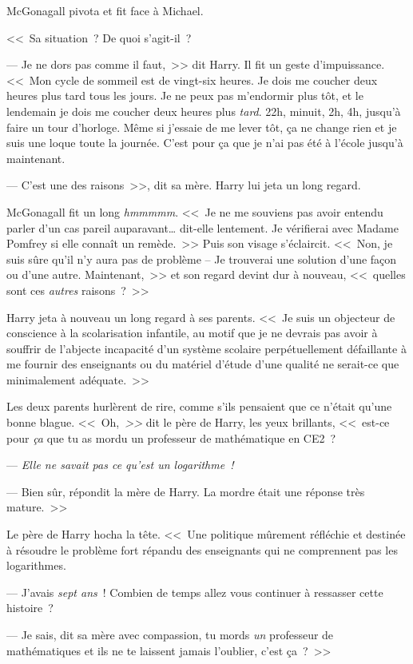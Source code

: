 McGonagall pivota et fit face à Michael.

<<~Sa situation~? De quoi s'agit-il~?

--- Je ne dors pas comme il faut,~>> dit Harry. Il fit un geste d'impuissance. <<~Mon cycle de sommeil est de vingt-six heures. Je dois me coucher deux heures plus tard tous les jours. Je ne peux pas m'endormir plus tôt, et le lendemain je dois me coucher deux heures plus \emph{tard}. 22h, minuit, 2h, 4h, jusqu'à faire un tour d'horloge. Même si j'essaie de me lever tôt, ça ne change rien et je suis une loque toute la journée. C'est pour ça que je n'ai pas été à l'école jusqu'à maintenant.

--- C'est une des raisons~>>, dit sa mère. Harry lui jeta un long regard.

McGonagall fit un long \emph{hmmmmm}. <<~Je ne me souviens pas avoir entendu parler d'un cas pareil auparavant… dit-elle lentement. Je vérifierai avec Madame Pomfrey si elle connaît un remède.~>> Puis son visage s'éclaircit. <<~Non, je suis sûre qu'il n'y aura pas de problème -- Je trouverai une solution d'une façon ou d'une autre. Maintenant,~>> et son regard devint dur à nouveau, <<~quelles sont ces \emph{autres} raisons~?~>>

Harry jeta à nouveau un long regard à ses parents. <<~Je suis un objecteur de conscience à la scolarisation infantile, au motif que je ne devrais pas avoir à souffrir de l'abjecte incapacité d'un système scolaire perpétuellement défaillante à me fournir des enseignants ou du matériel d'étude d'une qualité ne serait-ce que minimalement adéquate.~>>

Les deux parents hurlèrent de rire, comme s'ils pensaient que ce n'était qu'une bonne blague. <<~Oh,\emph{~>>} dit le père de Harry, les yeux brillants, <<~est-ce pour \emph{ça} que tu as mordu un professeur de mathématique en CE2~?

--- \emph{Elle ne savait pas ce qu'est un logarithme~!}

--- Bien sûr, répondit la mère de Harry. La mordre était une réponse très mature.~>>

Le père de Harry hocha la tête. <<~Une politique mûrement réfléchie et destinée à résoudre le problème fort répandu des enseignants qui ne comprennent pas les logarithmes.

--- J'avais \emph{sept ans}~! Combien de temps allez vous continuer à ressasser cette histoire~?

--- Je sais, dit sa mère avec compassion, tu mords \emph{un} professeur de mathématiques et ils ne te laissent jamais l'oublier, c'est ça~?~>>

